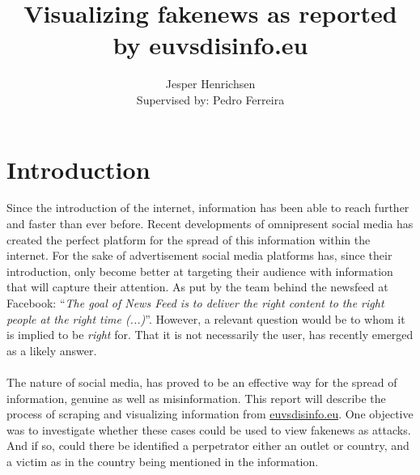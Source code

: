 \documentclass{article}
\title{Visualizing fakenews as reported by euvsdisinfo.eu}
\author{Jesper Henrichsen \\{\small Supervised by: Pedro Ferreira}}
\begin{document}
\maketitle
\newpage
\tableofcontents
\newpage

\section{Introduction}
Since the introduction of the internet, information has been able to reach further and faster than ever before. Recent developments of omnipresent social media has created the perfect platform for the spread of this information within the internet. For the sake of advertisement social media platforms has, since their introduction, only become better at targeting their audience with information that will capture their attention. As put by the team behind the newsfeed at Facebook: ``{\it The goal of News Feed is to deliver the right content to the right people at the right time (...)}''. However, a relevant question would be to whom it is implied to be {\it right} for. That it is not necessarily the user, has recently emerged as a likely answer.   
\\\\
The nature of social media, has proved to be an effective way for the spread of information, genuine as well as misinformation.
This report will describe the process of scraping and visualizing information from \href{https://euvsdisinfo.eu}{euvsdisinfo.eu}. One objective was to investigate whether these cases could be used to view fakenews as attacks. And if so, could there be identified a perpetrator either an outlet or country, and a victim as in the country being mentioned in the information.
\end{document}
